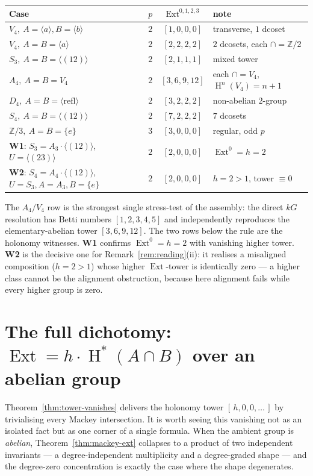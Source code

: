 \documentclass[11pt]{amsart}
\theoremstyle{plain}
\theoremstyle{definition}
\DeclareMathOperator{\Ext}{Ext}
\DeclareMathOperator{\Hh}{H}
\begin{document}
\begin{center}
\renewcommand{\arraystretch}{1.2}
\begin{tabular}{lccl}
\hline
Case & $p$ & $\Ext^{0,1,2,3}$ & note\\
\hline
$V_4,\ A=\langle a\rangle,B=\langle b\rangle$ & $2$ & $[1,0,0,0]$ & transverse, $1$ dcoset\\
$V_4,\ A=B=\langle a\rangle$ & $2$ & $[2,2,2,2]$ & $2$ dcosets, each $\cap=\mathbb{Z}/2$\\
$S_3,\ A=B=\langle(12)\rangle$ & $2$ & $[2,1,1,1]$ & mixed tower\\
$A_4,\ A=B=V_4$ & $2$ & $[3,6,9,12]$ & each $\cap=V_4$, $\Hh^n(V_4)=n{+}1$\\
$D_4,\ A=B=\langle\text{refl}\rangle$ & $2$ & $[3,2,2,2]$ & non-abelian $2$-group\\
$S_4,\ A=B=\langle(12)\rangle$ & $2$ & $[7,2,2,2]$ & $7$ dcosets\\
$\mathbb{Z}/3,\ A=B=\{e\}$ & $3$ & $[3,0,0,0]$ & regular, odd $p$\\
\hline
\textbf{W1}: $S_3{=}A_3{\cdot}\langle(12)\rangle$, $U{=}\langle(23)\rangle$ & $2$ & $[2,0,0,0]$ & $\Ext^0=h=2$\\
\textbf{W2}: $S_4{=}A_4{\cdot}\langle(12)\rangle$, $U{=}S_3,A{=}A_3,B{=}\{e\}$ & $2$ & $[2,0,0,0]$ & $h=2{>}1$, tower $\equiv 0$\\
\hline
\end{tabular}
\end{center}

The $A_4/V_4$ row is the strongest single stress-test of the assembly: the direct $kG$
resolution has Betti numbers $[1,2,3,4,5]$ and independently reproduces the
elementary-abelian tower $[3,6,9,12]$. The two rows below the rule are the holonomy
witnesses. \textbf{W1} confirms $\Ext^0=h=2$ with vanishing higher tower.
\textbf{W2} is the decisive one for Remark~\ref{rem:reading}(ii): it realises a misaligned
composition ($h=2>1$) whose higher $\Ext$-tower is identically zero --- a higher class
cannot be the alignment obstruction, because here alignment fails while every higher group
is zero.

\section{The full dichotomy: $\Ext=h\cdot\Hh^*(A\cap B)$ over an abelian group}\label{sec:dichotomy}

Theorem~\ref{thm:tower-vanishes} delivers the holonomy tower $[\,h,0,0,\dots\,]$ by
trivialising every Mackey intersection. It is worth seeing this vanishing not as an
isolated fact but as one corner of a single formula. When the ambient group is
\emph{abelian}, Theorem~\ref{thm:mackey-ext} collapses to a product of two independent
invariants --- a degree-independent multiplicity and a degree-graded shape --- and the
degree-zero concentration is exactly the case where the shape degenerates.
\end{document}
